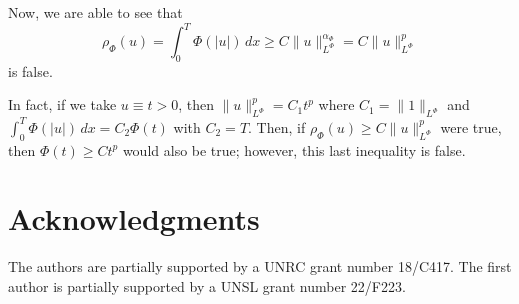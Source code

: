 \documentclass[twoside]{article}
\theoremstyle{remark}
\newcommand{\orlnor}{\|_{L^{\Phi}}}
\renewcommand{\geq}{\geqslant}
\begin{document}
Now, we are able to see that 
\[
\rho_{\Phi}(u)=\int_0^T \Phi(|u|)\,dx\geq C\|u\orlnor^{\alpha_{\Phi}}=C\|u\orlnor^p
\]
is false.

In fact, if we take $u\equiv t>0$, then $\|u\orlnor^p=C_1t^p$ where $C_1=\|1\orlnor$ and
$\int_0^T \Phi(|u|)\,dx=C_2\Phi(t)$ with $C_2=T$. 
Then, if $\rho_{\Phi}(u)\geq C\|u\orlnor^p$ were true, then $\Phi(t)\geq C t^p$ would also be true; however, this
last inequality is false.
 



\section*{Acknowledgments}
The authors are partially supported by a UNRC grant number 18/C417. The first author is  partially supported by a  UNSL grant number 22/F223. 


  
 
\end{document}
